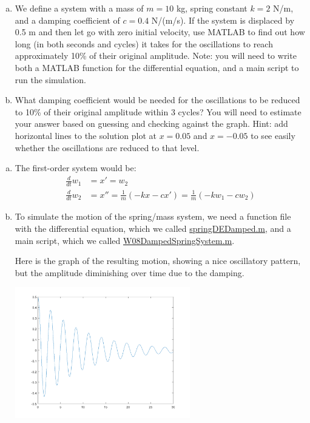 \begin{enumerate}
\begin{Question}
\begin{enumerate}[(a)]
\item We define a system with a mass of $m = 10$ kg, spring constant
  $k = 2$ N/m, and a damping coefficient of $c = 0.4$ N/(m/s).  If the
  system is displaced by 0.5 m and then let go with zero initial
  velocity, use MATLAB to find out how long (in both seconds and
  cycles) it takes for the oscillations to reach approximately 10\% of
  their original amplitude.  Note: you will need to write both a
  MATLAB function for the differential equation, and a main script to
  run the simulation.
\item What damping coefficient would be needed for the oscillations to
  be reduced to 10\% of their original amplitude within 3 cycles?  You
  will need to estimate your answer based on guessing and checking
  against the graph.  Hint: add horizontal lines to the solution plot
  at $x = 0.05$ and $x = -0.05$ to see easily whether the oscillations
  are reduced to that level.
\end{enumerate}
\end{Question}

\begin{Solution}
  \begin{enumerate}[(a)]
 \item  The first-order system would be:
 \begin{align*}
 \frac{d}{dt} w_1 & = x' = w_2 \\
 \frac{d}{dt} w_2 & = x'' = \frac{1}{m} \left(-kx -c x'\right) = \frac{1}{m} \left(-k w_1  - c w_2\right)
 \end{align*}

\item To simulate the motion of the spring/mass system, we need a
  function file with the differential equation, which we called
  \href{http://www.mast.queensu.ca/~apsc171/MNTCP01/PracticeProblems/MATLAB/springDEDamped.m}{springDEDamped.m},
  and a main script, which we called
  \href{http://www.mast.queensu.ca/~apsc171/MNTCP01/PracticeProblems/MATLAB/W08DampedSpringSystem.m}{W08DampedSpringSystem.m}.

  Here is the graph of the resulting motion, showing a nice
  oscillatory pattern, but the amplitude diminishing over time due to
  the damping.

\begin{center}
\includegraphics[width=3in]{graphics/Week08_Spring/W08DampedSpring1A}
\end{center}



\end{enumerate}
\end{Solution}
\end{enumerate}
